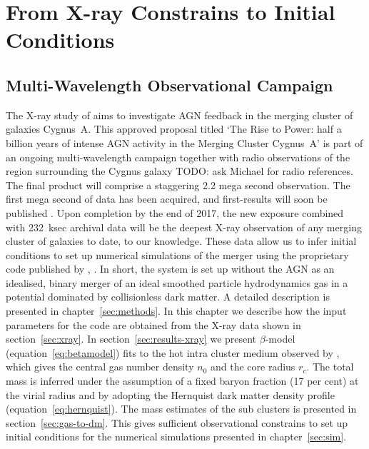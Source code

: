 \documentclass[MScProj_TLRH_ClusterEnergy.tex]{subfiles}
\begin{document}
\chapter{From X-ray Constrains to Initial Conditions}
\label{sec:constrains}

\section{Multi-Wavelength Observational Campaign}
\label{sec:wisecampaign}
The X-ray study of \citet{2014cxo..prop.4448W} aims to investigate AGN feedback 
in the merging cluster of galaxies Cygnus~A. This approved  
proposal titled `The Rise to Power: half a billion years of intense AGN activity 
in the Merging Cluster Cygnus~A' is part of an ongoing multi-wavelength campaign
together with radio observations of the region surrounding the Cygnus galaxy 
TODO: ask Michael for radio references. 
The final product will comprise a staggering 2.2 mega second observation. The
first mega second of data has been acquired, and first-results will soon be 
published \citep[in prep]{2016MNRAS.123..456W}. Upon completion by the end of 
2017, the new exposure combined with 232~ksec archival data will be the deepest
X-ray observation of any merging cluster of galaxies to date, to our knowledge. 
These data allow us to infer initial conditions to set up numerical simulations
of the merger using the proprietary code  published by
\citet{2014MNRAS.438.1971D}, \citet[in prep]{2016MNRAS.000.000D}. In short, the 
system is set up without the AGN as an idealised, binary merger of an ideal
smoothed particle hydrodynamics gas in a potential dominated by collisionless
dark matter. A detailed description is presented in chapter~\ref{sec:methods}.
In this chapter we describe how the input parameters for the code are obtained
from the X-ray data shown in section~\ref{sec:xray}. In 
section~\ref{sec:results-xray} we present $\beta$-model 
(equation~\eqref{eq:betamodel}) fits to the hot intra cluster medium observed
by , which gives the central gas number density $n_0$ 
and the core radius $r_c$. The total mass is inferred under the assumption of a
fixed baryon fraction (17 per cent) at the virial radius and by adopting the 
Hernquist dark matter density profile (equation~\eqref{eq:hernquist}). The mass
estimates of the sub clusters is presented in section~\ref{sec:gas-to-dm}. This
gives sufficient observational constrains to set up initial conditions for the 
numerical simulations presented in chapter~\ref{sec:sim}.
\end{document}
